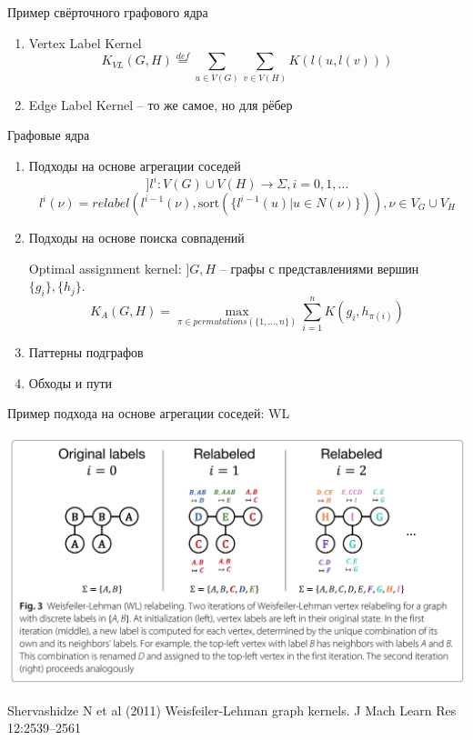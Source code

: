 \documentclass{beamer}
\newcommand{\defeq}{\overset{def}=}
\begin{document}
\begin{frame}{Пример свёрточного графового ядра}
	\begin{enumerate}[label=$\triangleright$]
		  \item Vertex Label Kernel
		\[ K_{VL}(G,H) \defeq \sum_{u \in V(G)} \sum_{v \in V(H)} K(l(u, l(v))) \]
		  \item Edge Label Kernel -- то же самое, но для рёбер
	\end{enumerate}
\end{frame}

\begin{frame}{Графовые ядра}
	\begin{enumerate}[label=$\triangleright$]
		\item Подходы на основе агрегации соседей
		\[ ] l^{i}: V(G) \cup V(H) \to \Sigma, i = 0, 1, \dots \]
		\[ l^i(\nu) = relabel\left( l^{i-1}(\nu), \text{sort}(\{ l^{i-1}(u) | u \in N(\nu) \}) \right), \nu \in V_G \cup V_H \]
		\pause
		\item Подходы на основе поиска совпадений
		
		Optimal assignment kernel: $ ] G, H $ -- графы с представлениями вершин $ \{g_i\}, \{h_j\} $.
		\[ K_A(G,H) = \max_{\pi \in permutations(\{1,\dots,n\})} \sum_{i=1}^{n} K(g_i, h_{\pi(i)}) \]
		\pause
		\item Паттерны подграфов
		\item Обходы и пути
	\end{enumerate}
\end{frame}

\begin{frame}{Пример подхода на основе агрегации соседей: WL}
\begin{center}
 \includegraphics[width=\textwidth]{wl}
\end{center}

Shervashidze N et al (2011) Weisfeiler-Lehman graph kernels.
J Mach Learn Res 12:2539–2561

\end{frame}
\end{document}
